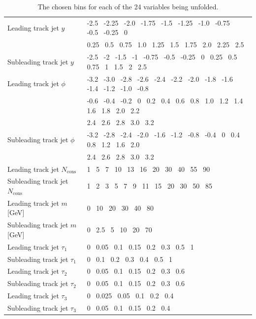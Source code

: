 \begin{table}[h!]
\begin{tabular}{l|l}
    Leading track jet $y$                   & -2.5~ -2.25~ -2.0~ -1.75~ -1.5~ -1.25~ -1.0~ -0.75~ -0.5~ -0.25~ 0~ \\
                                            & 0.25~ 0.5~ 0.75~ 1.0~ 1.25~ 1.5~ 1.75~ 2.0~ 2.25~ 2.5 \\ \hline
    Subleading track jet $y$                & -2.5~ -2~ -1.5~ -1~ -0.75~ -0.5~ -0.25~ 0~ 0.25~ 0.5~ 0.75~ 1~ 1.5~ 2~ 2.5 \\ \hline
    Leading track jet $\phi$                & -3.2~ -3.0~ -2.8~ -2.6~ -2.4~ -2.2~ -2.0~ -1.8~ -1.6~ -1.4~ -1.2~ -1.0~ -0.8~ \\
                                            & -0.6~ -0.4~ -0.2~ 0~ 0.2~ 0.4~ 0.6~ 0.8~ 1.0~ 1.2~ 1.4~ 1.6~ 1.8~ 2.0~ 2.2~ \\
                                            & 2.4~ 2.6~ 2.8~ 3.0~ 3.2 \\ \hline
    Subleading track jet $\phi$             & -3.2~ -2.8~ -2.4~ -2.0~ -1.6~ -1.2~ -0.8~ -0.4~ 0~ 0.4~ 0.8~ 1.2~ 1.6~ 2.0~ \\
                                            & 2.4~ 2.6~ 2.8~ 3.0~ 3.2 \\ \hline
    Leading track jet $N_{\text{cons}}$     & 1~ 5~ 7~ 10~ 13~ 16~ 20~ 30~ 40~ 55~ 90 \\ \hline
    Subleading track jet $N_{\text{cons}}$  & 1~ 2~ 3~ 5~ 7~ 9~ 11~ 15~ 20~ 30~ 50~ 85 \\ \hline
    Leading track jet $m$ [GeV]             & 0~ 10~ 20~ 30~ 40~ 80 \\ \hline
    Subleading track jet $m$ [GeV]          & 0~ 2.5~ 5~ 10~ 20~ 70 \\ \hline
    Leading track jet $\tau_1$              & 0~ 0.05~ 0.1~ 0.15~ 0.2~ 0.3~ 0.5~ 1 \\ \hline
    Subleading track jet $\tau_1$           & 0~ 0.1~ 0.2~ 0.3~ 0.4~ 0.5~ 1 \\ \hline
    Leading track jet $\tau_2$              & 0~ 0.05~ 0.1~ 0.15~ 0.2~ 0.3~ 0.6 \\ \hline
    Subleading track jet $\tau_2$           & 0~ 0.05~ 0.1~ 0.15~ 0.2~ 0.3~ 0.6 \\ \hline
    Leading track jet $\tau_3$              & 0~ 0.025~ 0.05~ 0.1~ 0.2~ 0.4 \\ \hline
    Subleading track jet $\tau_3$           & 0~ 0.05~ 0.1~ 0.15~ 0.2~ 0.4 \\ \hline

    \end{tabular}
    \caption{The chosen bins for each of the 24 variables being unfolded.}
    \label{tab:IBUBins}
\end{table}

